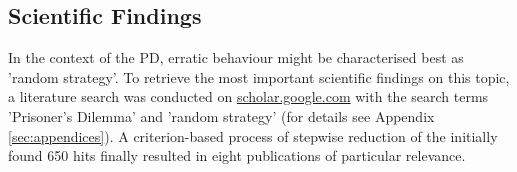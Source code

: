 \documentclass[11pt]{article}
\begin{document}
%
%
%
%
\subsection{Scientific Findings} \label{sec:scientific_findings}
In the context of the PD, erratic behaviour might be characterised best as 'random strategy'.
To retrieve the most important scientific findings on this topic, a literature search was conducted on \url{scholar.google.com} with the search terms 'Prisoner's Dilemma' and 'random strategy' (for details see Appendix \ref{sec:appendices}).
A criterion-based process of stepwise reduction of the initially found 650 hits finally resulted in eight publications of particular relevance.
\end{document}
